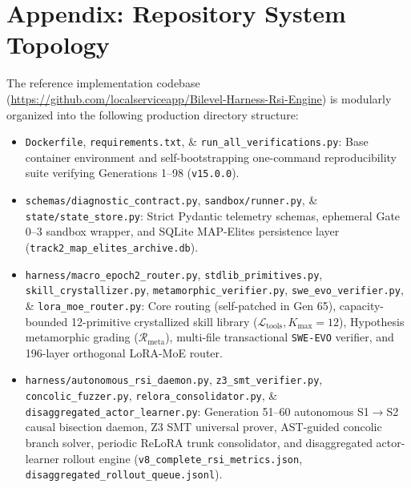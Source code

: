 \documentclass[10pt,twocolumn,letterpaper]{article}
\begin{document}
\appendix
\section{Appendix: Repository System Topology}
The reference implementation codebase (\url{https://github.com/localserviceapp/Bilevel-Harness-Rsi-Engine}) is modularly organized into the following production directory structure:
\begin{itemize}
    \item \texttt{Dockerfile}, \texttt{requirements.txt}, \& \texttt{run\_\allowbreak all\_\allowbreak verifications.py}: Base container environment and self-bootstrapping one-command reproducibility suite verifying Generations 1--98 (\texttt{v15.0.0}).
    \item \texttt{schemas/\allowbreak diagnostic\_\allowbreak contract.py}, \texttt{sandbox/\allowbreak runner.py}, \& \texttt{state/\allowbreak state\_\allowbreak store.py}: Strict Pydantic telemetry schemas, ephemeral Gate 0--3 sandbox wrapper, and SQLite MAP-Elites persistence layer (\texttt{track2\_\allowbreak map\_\allowbreak elites\_\allowbreak archive.db}).
    \item \texttt{harness/\allowbreak macro\_\allowbreak epoch2\_\allowbreak router.py}, \texttt{stdlib\_\allowbreak primitives.py}, \texttt{skill\_\allowbreak crystallizer.py}, \texttt{metamorphic\_\allowbreak verifier.py}, \texttt{swe\_\allowbreak evo\_\allowbreak verifier.py}, \& \texttt{lora\_\allowbreak moe\_\allowbreak router.py}: Core routing (self-patched in Gen 65), capacity-bounded 12-primitive crystallized skill library ($\mathcal{L}_{\text{tools}}, K_{\max}=12$), Hypothesis metamorphic grading ($\mathcal{R}_{\text{meta}}$), multi-file transactional \texttt{SWE-EVO} verifier, and 196-layer orthogonal LoRA-MoE router.
    \item \texttt{harness/\allowbreak autonomous\_\allowbreak rsi\_\allowbreak daemon.py}, \texttt{z3\_\allowbreak smt\_\allowbreak verifier.py}, \texttt{concolic\_\allowbreak fuzzer.py}, \texttt{relora\_\allowbreak consolidator.py}, \& \texttt{disaggregated\_\allowbreak actor\_\allowbreak learner.py}: Generation 51--60 autonomous S1$\to$S2 causal bisection daemon, Z3 SMT universal prover, AST-guided concolic branch solver, periodic ReLoRA trunk consolidator, and disaggregated actor-learner rollout engine (\texttt{v8\_\allowbreak complete\_\allowbreak rsi\_\allowbreak metrics.json}, \texttt{disaggregated\_\allowbreak rollout\_\allowbreak queue.jsonl}).

\end{itemize}
\end{document}

